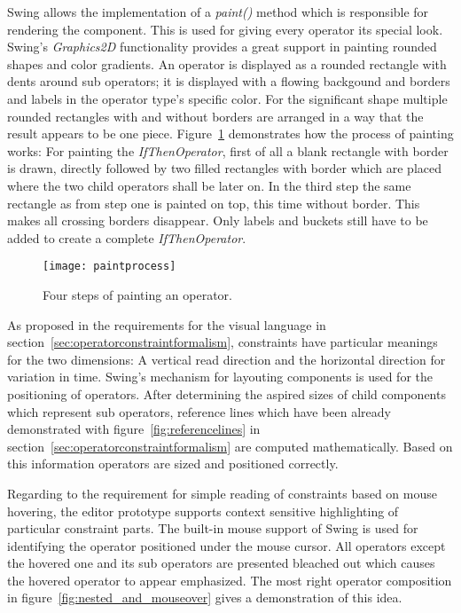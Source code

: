 Swing allows the implementation of a \emph{paint()} method which is responsible for rendering the component. This is used for giving every operator its special look. Swing's \emph{Graphics2D} functionality provides a great support in painting rounded shapes and color gradients. An operator is displayed as a rounded rectangle with dents around sub operators; it is displayed with a flowing backgound and borders and labels in the operator type's specific color. For the significant shape multiple rounded rectangles with and without borders are arranged in a way that the result appears to be one piece. Figure~\ref{fig:paintprocess} demonstrates how the process of painting works: For painting the \emph{IfThenOperator}, first of all a blank rectangle with border is drawn, directly followed by two filled rectangles with border which are placed where the two child operators shall be later on. In the third step the same rectangle as from step one is painted on top, this time without border. This makes all crossing borders disappear. Only labels and buckets still have to be added to create a complete \emph{IfThenOperator}.

\begin{figure}[htbp]
  \centering
  \texttt{[image: paintprocess]} 
  \caption{Four steps of painting an operator.}
  \label{fig:paintprocess}
\end{figure}


As proposed in the requirements for the visual language in section~\ref{sec:operatorconstraintformalism}, constraints have particular meanings for the two dimensions: A vertical read direction and the horizontal direction for variation in time. 
Swing's mechanism for layouting components is used for the positioning of operators. After determining the aspired sizes of child components which represent sub operators, reference lines which have been already demonstrated with figure~\ref{fig:referencelines} in section~\ref{sec:operatorconstraintformalism} are computed mathematically. Based on this information operators are sized and positioned correctly.


Regarding to the requirement for simple reading of constraints based on mouse hovering, the editor prototype supports context sensitive highlighting of particular constraint parts.
The built-in mouse support of Swing is used for identifying the operator positioned under the mouse cursor. All operators except the hovered one and its sub operators are presented bleached out which causes the hovered operator to appear emphasized. The most right operator composition in figure~\ref{fig:nested_and_mouseover} gives a demonstration of this idea.

